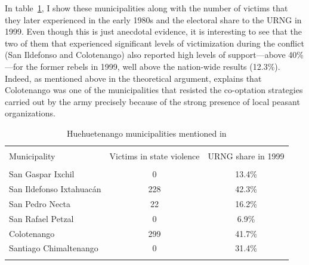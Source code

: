 \documentclass[12pt, notitlepage]{article}
\begin{document}
In table~\ref{tab:6muni}, I show these municipalities along with the number of victims that they later experienced in the early 1980s and the electoral share to the URNG in 1999.
Even though this is just anecdotal evidence, it is interesting to see that the two of them that experienced significant levels of victimization during the conflict (San Ildefonso and Colotenango) also reported high levels of support---above 40\%---for the former rebels in 1999, well above the nation-wide results (12.3\%).
Indeed, as mentioned above in the theoretical argument, \citet[223--226]{Kobrak:2013aa} explains that Colotenango was one of the municipalities that resisted the co-optation strategies carried out by the army precisely because of the strong presence of local peasant organizations.

\begin{table}[!htbp] \centering
  \caption{Huehuetenango municipalities mentioned in \citet{Imparcial:1974aa}}\label{tab:6muni}
  \small

  \begin{tabular}{lcc}
  \\[-1.8ex]\hline
  \hline \\[-1.8ex]
  Municipality & Victims in state violence & URNG share in 1999  \\
  \hline \\[-1.8ex]
  San Gaspar Ixchil & 0 & 13.4\% \\
  San Ildefonso Ixtahuacán & 228 & 42.3\% \\
  San Pedro Necta & 22 & 16.2\% \\
  San Rafael Petzal & 0 & 6.9\% \\
  Colotenango & 299 & 41.7\% \\
  Santiago Chimaltenango & 0 & 31.4\% \\
  \hline
  \hline \\[-1.8ex]
  \end{tabular}

\end{table}

%
\end{document}
